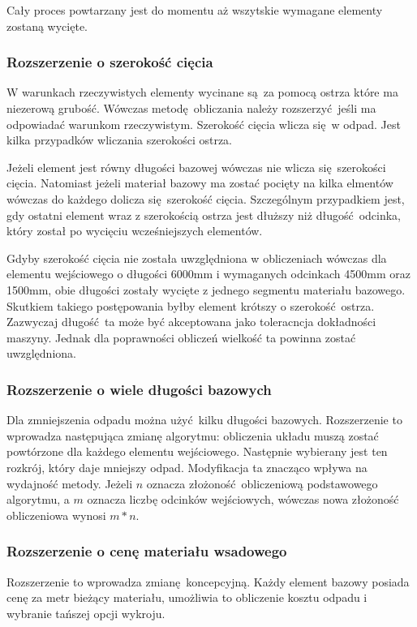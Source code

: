 Cały proces powtarzany jest do momentu aż wszytskie wymagane elementy zostaną wycięte.

\subsubsection{Rozszerzenie o szerokość cięcia}
W warunkach rzeczywistych elementy wycinane są za pomocą ostrza które ma niezerową grubość. Wówczas metodę obliczania należy rozszerzyć jeśli ma odpowiadać warunkom rzeczywistym. Szerokość cięcia wlicza się w odpad. Jest kilka przypadków wliczania szerokości ostrza.

Jeżeli element jest równy długości bazowej wówczas nie wlicza się szerokości cięcia. Natomiast jeżeli materiał bazowy ma zostać pocięty na kilka elmentów wówczas do każdego dolicza się szerokość cięcia. Szczególnym przypadkiem jest, gdy ostatni element wraz z szerokością ostrza jest dłuższy niż długość odcinka, który został po wycięciu wcześniejszych elementów.

Gdyby szerokość cięcia nie została uwzględniona w obliczeniach wówczas dla elementu wejściowego o długości 6000mm i wymaganych odcinkach 4500mm oraz 1500mm, obie długości zostały wycięte z jednego segmentu materiału bazowego. Skutkiem takiego postępowania byłby element krótszy o szerokość ostrza. Zazwyczaj długość ta może być akceptowana jako toleracncja dokładności maszyny. Jednak dla poprawności obliczeń wielkość ta powinna zostać uwzględniona.

\subsubsection{Rozszerzenie o wiele długości bazowych}
Dla zmniejszenia odpadu można użyć kilku długości bazowych. Rozszerzenie to wprowadza następująca zmianę algorytmu: obliczenia układu muszą zostać powtórzone dla każdego elementu wejściowego. Następnie wybierany jest ten rozkrój, który daje mniejszy odpad. Modyfikacja ta znacząco wpływa na wydajność metody. Jeżeli $n$ oznacza złożoność obliczeniową podstawowego algorytmu, a $m$ oznacza liczbę odcinków wejściowych, wówczas nowa złożoność obliczeniowa wynosi $m*n$. %

\subsubsection{Rozszerzenie o cenę materiału wsadowego}
Rozszerzenie to wprowadza zmianę koncepcyjną. Każdy element bazowy posiada cenę za metr bieżący materiału, umożliwia to obliczenie kosztu odpadu i wybranie tańszej opcji wykroju.


